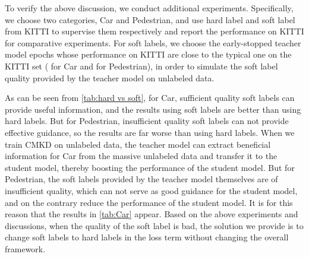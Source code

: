 \documentclass[runningheads]{llncs}
\begin{document}
\begin{table}[t]
    \centering
    \small
    \caption{Comparison between hard labels and soft labels used in .
    Among them, the soft labels for Car are of sufficient quality, and the soft labels for Pedestrian are of insufficient quality. 
    We choose the early-stopped teacher model epochs to simulate the soft label quality that can be provided on unlabeled data.}
    \label{tab:hard vs soft}
\end{table}

To verify the above discussion, we conduct additional experiments.
Specifically, we choose two categories, Car and Pedestrian, and use hard label and soft label from KITTI  to supervise them respectively and report the performance on KITTI  for comparative experiments.
For soft labels, we choose the early-stopped teacher model epochs whose performance on KITTI  are close to the typical one on the KITTI  set ( for Car and  for Pedestrian), in order to simulate the soft label quality provided by the teacher model on unlabeled data.

As can be seen from \cref{tab:hard vs soft}, for Car, sufficient quality soft labels can provide useful information, and the results using soft labels are better than using hard labels.
But for Pedestrian, insufficient quality soft labels can not provide effective guidance, so the results are far worse than using hard labels.
When we train CMKD on unlabeled data, the teacher model can extract beneficial information for Car from the massive unlabeled data and transfer it to the student model, thereby boosting the performance of the student model.
But for Pedestrian, the soft labels provided by the teacher model themselves are of insufficient quality, which can not serve as good guidance for the student model, and on the contrary reduce the performance of the student model. 
It is for this reason that the results in \cref{tab:Car} appear.
Based on the above experiments and discussions, when the quality of the soft label is bad, the solution we provide is to change soft labels to hard labels in the loss term  without changing the overall framework.
\end{document}
